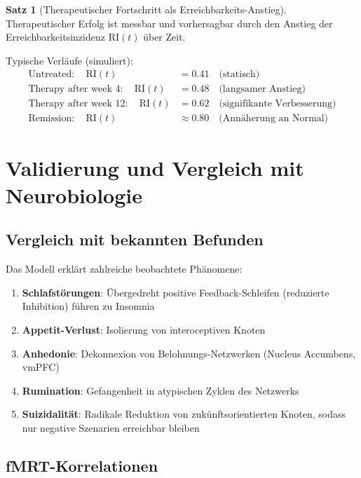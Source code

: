 \documentclass[a4paper,12pt]{article}
\theoremstyle{definition}
\newtheorem{satz}{Satz}
\begin{document}
\begin{satz}[Therapeutischer Fortschritt als Erreichbarkeits-Anstieg]
Therapeutischer Erfolg ist messbar und vorhersagbar durch den Anstieg der Erreichbarkeitsinzidenz $\text{RI}(t)$ über Zeit.
\end{satz}

Typische Verläufe (simuliert):
\begin{align}
\text{Untreated}: \quad \text{RI}(t) &= 0.41 \quad \text{(statisch)} \\
\text{Therapy after week 4}: \quad \text{RI}(t) &= 0.48 \quad \text{(langsamer Anstieg)} \\
\text{Therapy after week 12}: \quad \text{RI}(t) &= 0.62 \quad \text{(signifikante Verbesserung)} \\
\text{Remission}: \quad \text{RI}(t) &\approx 0.80 \quad \text{(Annäherung an Normal)}
\end{align}

\section{Validierung und Vergleich mit Neurobiologie}

\subsection{Vergleich mit bekannten Befunden}

Das Modell erklärt zahlreiche beobachtete Phänomene:

\begin{enumerate}
	\item \textbf{Schlafstörungen}: Übergedreht positive Feedback-Schleifen (reduzierte Inhibition) führen zu Insomnia
	\item \textbf{Appetit-Verlust}: Isolierung von interoceptiven Knoten
	\item \textbf{Anhedonie}: Dekonnexion von Belohnungs-Netzwerken (Nucleus Accumbens, vmPFC)
	\item \textbf{Rumination}: Gefangenheit in atypischen Zyklen des Netzwerks
	\item \textbf{Suizidalität}: Radikale Reduktion von zukünftsorientierten Knoten, sodass nur negative Szenarien erreichbar bleiben
\end{enumerate}

\subsection{fMRT-Korrelationen}
\end{document}
